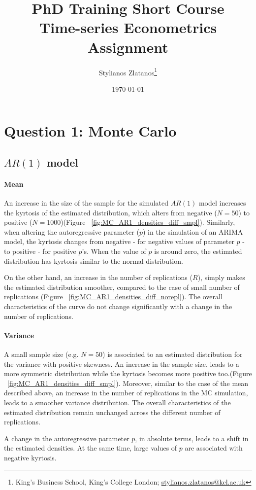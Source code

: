 \documentclass{article}
\title{PhD Training Short Course \\ Time-series Econometrics \\ Assignment}
\author[1]{Stylianos Zlatanos\thanks{King's Business School, King's College London; \href{mailto:stylianos.zlatanos@kcl.ac.uk}{stylianos.zlatanos@kcl.ac.uk}}}
\date{\today}
\begin{document}
\maketitle

\section{Question 1: Monte Carlo}
\subsection{$AR(1)$ model}
\paragraph{Mean}
An increase in the size of the sample for the simulated $AR(1)$ model increases the kyrtosis of the estimated distribution, which alters from negative ($N=50$) to positive ($N=1000$)(Figure ~\ref{fig:MC_AR1_densities_diff_smpl}). Similarly, when altering the autoregressive parameter ($p$) in the simulation of an ARIMA model, the kyrtosis changes from negative - for negative values of parameter $p$ - to positive - for positive $p$'s. When the value of $p$ is around zero, the estimated distribution has kyrtosis similar to the normal distribution. 
\par
On the other hand, an increase in the number of replications ($R$), simply makes the estimated distribution smoother, compared to the case of small number of replications (Figure ~\ref{fig:MC_AR1_densities_diff_norepl}). The overall characteristics of the curve do not change significantly with a change in the number of replications.


\paragraph{Variance}
A small sample size (e.g. $N=50$) is associated to an estimated distribution for the variance with positive skewness. An increase in the sample size, leads to a more symmetric distribution while the kyrtosis becomes more positive too.(Figure ~\ref{fig:MC_AR1_densities_diff_smpl}). Moreover, similar to the case of the mean described above, an increase in the number of replications in the MC simulation, leads to a smoother variance distribution. The overall characteristics of the estimated distribution remain unchanged across the different number of replications.
\par
A change in the autoregressive parameter $p$, in absolute terms, leads to a shift in the estimated densities. At the same time, large values of $p$ are associated with negative kyrtosis.
\end{document}
